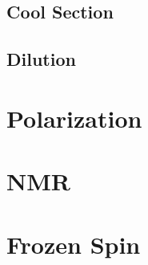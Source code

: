 \subsection{Cool \het{} Section}
\subsection{Dilution}

\section{Polarization}

\section{NMR}

\section{Frozen Spin}
